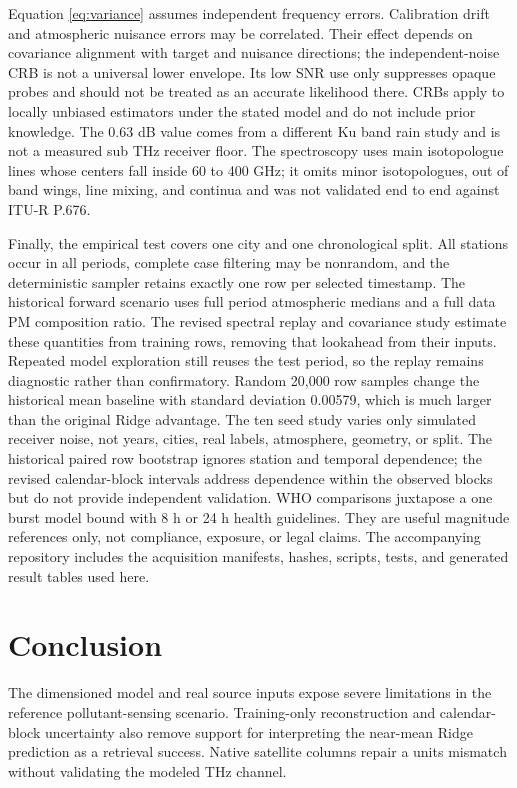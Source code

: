\documentclass[conference]{IEEEtran}
\begin{document}
Equation \eqref{eq:variance} assumes independent frequency errors. Calibration drift and atmospheric nuisance errors may be correlated. Their effect depends on covariance alignment with target and nuisance directions; the independent-noise CRB is not a universal lower envelope. Its low SNR use only suppresses opaque probes and should not be treated as an accurate likelihood there. CRBs apply to locally unbiased estimators under the stated model and do not include prior knowledge. The 0.63 dB value comes from a different Ku band rain study and is not a measured sub THz receiver floor. The spectroscopy uses main isotopologue lines whose centers fall inside 60 to 400 GHz; it omits minor isotopologues, out of band wings, line mixing, and continua and was not validated end to end against ITU-R P.676.

Finally, the empirical test covers one city and one chronological split. All stations occur in all periods, complete case filtering may be nonrandom, and the deterministic sampler retains exactly one row per selected timestamp. The historical forward scenario uses full period atmospheric medians and a full data PM composition ratio. The revised spectral replay and covariance study estimate these quantities from training rows, removing that lookahead from their inputs. Repeated model exploration still reuses the test period, so the replay remains diagnostic rather than confirmatory. Random 20,000 row samples change the historical mean baseline with standard deviation 0.00579, which is much larger than the original Ridge advantage. The ten seed study varies only simulated receiver noise, not years, cities, real labels, atmosphere, geometry, or split. The historical paired row bootstrap ignores station and temporal dependence; the revised calendar-block intervals address dependence within the observed blocks but do not provide independent validation. WHO comparisons juxtapose a one burst model bound with 8 h or 24 h health guidelines. They are useful magnitude references only, not compliance, exposure, or legal claims. The accompanying repository includes the acquisition manifests, hashes, scripts, tests, and generated result tables used here.

\section{Conclusion}
The dimensioned model and real source inputs expose severe limitations in the reference pollutant-sensing scenario. Training-only reconstruction and calendar-block uncertainty also remove support for interpreting the near-mean Ridge prediction as a retrieval success. Native satellite columns repair a units mismatch without validating the modeled THz channel.
\end{document}
